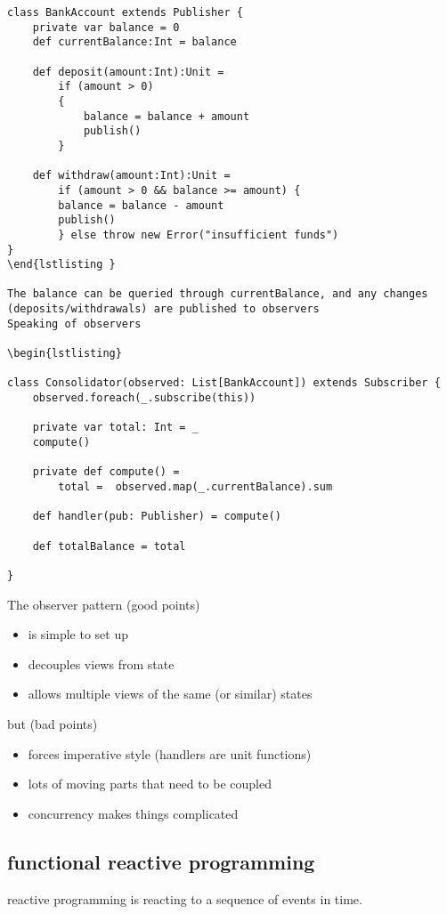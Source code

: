 \begin{lstlisting}
class BankAccount extends Publisher {
	private var balance = 0
	def currentBalance:Int = balance

	def deposit(amount:Int):Unit = 
		if (amount > 0) 
		{
			balance = balance + amount
			publish()
		}

	def withdraw(amount:Int):Unit = 
		if (amount > 0 && balance >= amount) {
		balance = balance - amount
		publish()
		} else throw new Error("insufficient funds")
}
\end{lstlisting }

The balance can be queried through currentBalance, and any changes (deposits/withdrawals) are published to observers
Speaking of observers

\begin{lstlisting}

class Consolidator(observed: List[BankAccount]) extends Subscriber {
	observed.foreach(_.subscribe(this))

	private var total: Int = _
	compute()

	private def compute() =
		total =  observed.map(_.currentBalance).sum

	def handler(pub: Publisher) = compute()

	def totalBalance = total

}
\end{lstlisting}

The observer pattern (good points)
\begin{itemize}
	\item is simple to set up
	\item decouples views from state
	\item allows multiple views of the same (or similar) states
\end{itemize}

but (bad points)
\begin{itemize}
	\item forces imperative style (handlers are unit functions)
	\item lots of moving parts that need to be coupled
	\item concurrency makes things complicated
\end{itemize}

\subsection{functional reactive programming}
reactive programming is reacting to a sequence of events in time.

